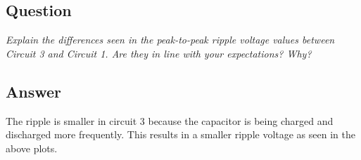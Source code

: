 \documentclass[a4paper,12pt]{article}
\begin{document}
	\subsection*{Question}	
	\textit{Explain the differences seen in the peak-to-peak ripple voltage values between Circuit 3 and Circuit 1. Are they in line with your expectations? Why?}
	
	\subsection*{Answer}
	The ripple is smaller in circuit 3 because the capacitor is being charged and discharged more frequently. This results in a smaller ripple voltage as seen in the above plots.
\end{document}
